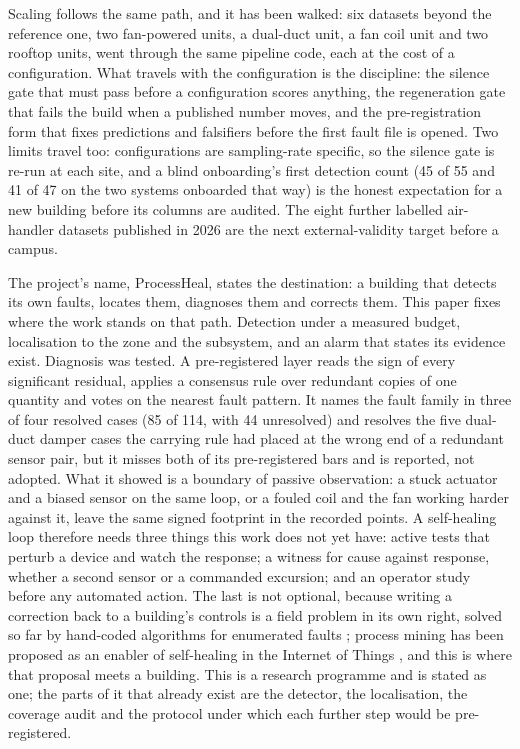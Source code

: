 \documentclass[11pt,letterpaper]{article}
\begin{document}
Scaling follows the same path, and it has been walked: six datasets beyond the reference one, two fan-powered units, a dual-duct unit, a fan coil unit and two rooftop units, went through the same pipeline code, each at the cost of a configuration. What travels with the configuration is the discipline: the silence gate that must pass before a configuration scores anything, the regeneration gate that fails the build when a published number moves, and the pre-registration form that fixes predictions and falsifiers before the first fault file is opened. Two limits travel too: configurations are sampling-rate specific, so the silence gate is re-run at each site, and a blind onboarding's first detection count (45 of 55 and 41 of 47 on the two systems onboarded that way) is the honest expectation for a new building before its columns are audited. The eight further labelled air-handler datasets published in 2026 \cite{ghalamsiah2026ahudatasets} are the next external-validity target before a campus.

The project's name, ProcessHeal, states the destination: a building that detects its own faults, locates them, diagnoses them and corrects them. This paper fixes where the work stands on that path. Detection under a measured budget, localisation to the zone and the subsystem, and an alarm that states its evidence exist. Diagnosis was tested. A pre-registered layer reads the sign of every significant residual, applies a consensus rule over redundant copies of one quantity and votes on the nearest fault pattern. It names the fault family in three of four resolved cases (85 of 114, with 44 unresolved) and resolves the five dual-duct damper cases the carrying rule had placed at the wrong end of a redundant sensor pair, but it misses both of its pre-registered bars and is reported, not adopted. What it showed is a boundary of passive observation: a stuck actuator and a biased sensor on the same loop, or a fouled coil and the fan working harder against it, leave the same signed footprint in the recorded points. A self-healing loop therefore needs three things this work does not yet have: active tests that perturb a device and watch the response; a witness for cause against response, whether a second sensor or a commanded excursion; and an operator study before any automated action. The last is not optional, because writing a correction back to a building's controls is a field problem in its own right, solved so far by hand-coded algorithms for enumerated faults \cite{lin2020faultcorrection,pritoni2022faultcorrection}; process mining has been proposed as an enabler of self-healing in the Internet of Things \cite{singh2022pmselfhealing}, and this is where that proposal meets a building. This is a research programme and is stated as one; the parts of it that already exist are the detector, the localisation, the coverage audit and the protocol under which each further step would be pre-registered.
\end{document}
